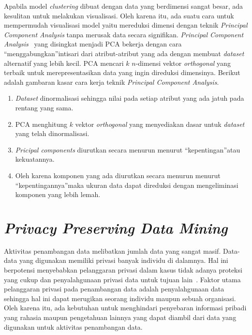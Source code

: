 Apabila model \textit{clustering} dibuat dengan data yang berdimensi sangat besar, ada kesulitan untuk melakukan visualisasi. Oleh karena itu, ada suatu cara untuk mempermudah visualisasi model yaitu mereduksi dimensi dengan teknik \textit{Principal Component Analysis} tanpa merusak data secara signifikan. \textit{Principal Component Analysis}~\cite{jiawei:12:datmin} yang disingkat menjadi PCA bekerja dengan cara \textquotedblleft menggabungkan\textquotedblright intisari dari atribut-atribut yang ada dengan membuat \textit{dataset} alternatif yang lebih kecil. PCA mencari \(k\) \(n\)-dimensi vektor \textit{orthogonal} yang terbaik untuk merepresentasikan data yang ingin direduksi dimensinya. Berikut adalah gambaran kasar cara kerja teknik \textit{Principal Component Analysis}.
\begin{enumerate}
	\item \textit{Dataset} dinormalisasi sehingga nilai pada setiap atribut yang ada jatuh pada rentang yang sama.
	\item PCA menghitung \(k\) vektor \textit{orthogonal} yang menyediakan dasar untuk \textit{dataset} yang telah dinormalisasi.
	\item \textit{Pricipal components} diurutkan secara menurun menurut \textquotedblleft kepentingan\textquotedblright atau kekuatannya.
	\item Oleh karena komponen yang ada diurutkan secara menurun menurut \textquotedblleft kepentingannya\textquotedblright maka ukuran data dapat direduksi dengan mengeliminasi komponen yang lebih lemah.
\end{enumerate}

\section{\textit{Privacy Preserving Data Mining}}
\label{sec:ppdm}

Aktivitas penambangan data melibatkan jumlah data yang sangat masif. Data-data yang digunakan memiliki privasi banyak individu di dalamnya. Hal ini berpotensi menyebabkan pelanggaran privasi dalam kasus tidak adanya proteksi yang cukup dan penyalahgunaan privasi data untuk tujuan lain~\cite{rezaseifi:11:ppdm}. Faktor utama pelanggaran privasi pada penambangan data adalah penyalahgunaan data sehingga hal ini dapat merugikan seorang individu maupun sebuah organisasi. Oleh karena itu, ada kebutuhan untuk menghindari penyebaran informasi pribadi yang rahasia maupun pengetahuan lainnya yang dapat diambil dari data yang digunakan untuk aktivitas penambangan data.

